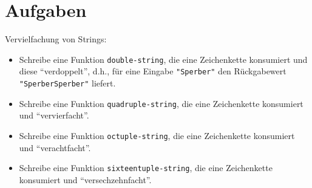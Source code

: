 \section*{Aufgaben}



\begin{aufgabe}
 Vervielfachung von Strings:
 \begin{itemize}
  \item Schreibe eine Funktion \texttt{double-string}, die eine Zeichenkette konsumiert und
    diese "`verdoppelt"', d.h., für eine Eingabe \verb|"Sperber"| den
    Rückgabewert \verb|"SperberSperber"| liefert.
    
  \item Schreibe eine Funktion \texttt{quadruple-string}, die eine
    Zeichenkette konsumiert und "`vervierfacht"'.

  \item Schreibe eine Funktion \texttt{octuple-string}, die eine
    Zeichenkette konsumiert und "`verachtfacht"'.

  \item Schreibe eine Funktion \texttt{sixteentuple-string}, die
    eine Zeichenkette konsumiert und "`versechzehnfacht"'.
  \end{itemize}


\end{aufgabe}

